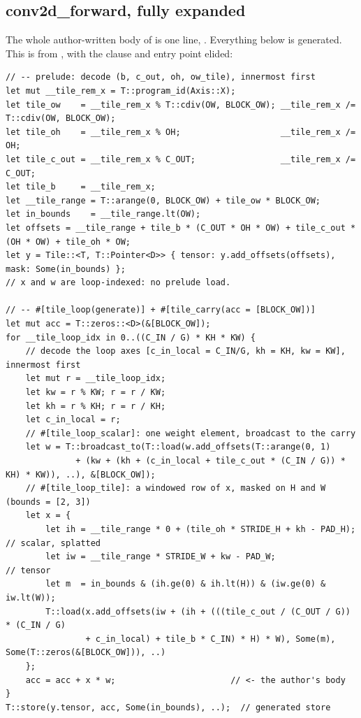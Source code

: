 \subsection{conv2d\_forward, fully expanded}

The whole author-written body of  is one line,
. Everything below is generated. This is from
, with the  clause
and entry point elided:

\begin{lstlisting}
// -- prelude: decode (b, c_out, oh, ow_tile), innermost first
let mut __tile_rem_x = T::program_id(Axis::X);
let tile_ow    = __tile_rem_x % T::cdiv(OW, BLOCK_OW); __tile_rem_x /= T::cdiv(OW, BLOCK_OW);
let tile_oh    = __tile_rem_x % OH;                    __tile_rem_x /= OH;
let tile_c_out = __tile_rem_x % C_OUT;                 __tile_rem_x /= C_OUT;
let tile_b     = __tile_rem_x;
let __tile_range = T::arange(0, BLOCK_OW) + tile_ow * BLOCK_OW;
let in_bounds    = __tile_range.lt(OW);
let offsets = __tile_range + tile_b * (C_OUT * OH * OW) + tile_c_out * (OH * OW) + tile_oh * OW;
let y = Tile::<T, T::Pointer<D>> { tensor: y.add_offsets(offsets), mask: Some(in_bounds) };
// x and w are loop-indexed: no prelude load.

// -- #[tile_loop(generate)] + #[tile_carry(acc = [BLOCK_OW])]
let mut acc = T::zeros::<D>(&[BLOCK_OW]);
for __tile_loop_idx in 0..((C_IN / G) * KH * KW) {
    // decode the loop axes [c_in_local = C_IN/G, kh = KH, kw = KW], innermost first
    let mut r = __tile_loop_idx;
    let kw = r % KW; r = r / KW;
    let kh = r % KH; r = r / KH;
    let c_in_local = r;
    // #[tile_loop_scalar]: one weight element, broadcast to the carry
    let w = T::broadcast_to(T::load(w.add_offsets(T::arange(0, 1)
              + (kw + (kh + (c_in_local + tile_c_out * (C_IN / G)) * KH) * KW)), ..), &[BLOCK_OW]);
    // #[tile_loop_tile]: a windowed row of x, masked on H and W (bounds = [2, 3])
    let x = {
        let ih = __tile_range * 0 + (tile_oh * STRIDE_H + kh - PAD_H);  // scalar, splatted
        let iw = __tile_range * STRIDE_W + kw - PAD_W;                   // tensor
        let m  = in_bounds & (ih.ge(0) & ih.lt(H)) & (iw.ge(0) & iw.lt(W));
        T::load(x.add_offsets(iw + (ih + (((tile_c_out / (C_OUT / G)) * (C_IN / G)
                + c_in_local) + tile_b * C_IN) * H) * W), Some(m), Some(T::zeros(&[BLOCK_OW])), ..)
    };
    acc = acc + x * w;                       // <- the author's body
}
T::store(y.tensor, acc, Some(in_bounds), ..);  // generated store
\end{lstlisting}

